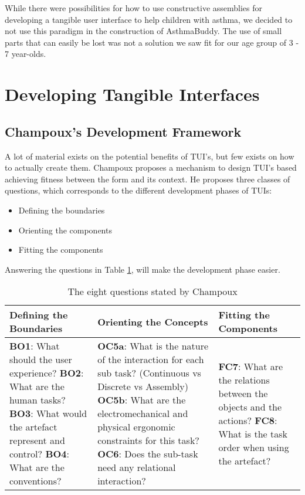 While there were possibilities for how to use constructive assemblies for developing a tangible user interface to help children with asthma, we decided to not use this paradigm in the construction of AsthmaBuddy. The use of small parts that can easily be lost was not a solution we saw fit for our age group of 3 - 7 year-olds.


\section{Developing Tangible Interfaces}

\subsection{Champoux's Development Framework}
\label{sec:champoux}
A lot of material exists on the potential benefits of TUI's, but few exists on how to actually create them. Champoux proposes a mechanism to design TUI's based achieving fitness between the form and its context\cite{champoux2007design}.
He proposes three classes of questions, which corresponds to the different development phases of TUIs:
\begin{itemize}
  \item Defining the boundaries
  \item Orienting the components
  \item Fitting the components
\end{itemize} 


Answering the questions in Table \ref{tab:tuidesign}, will make the development phase easier.   


\begin{table}[h]
	\begin{tabular}{| p{5.0cm} | p{5.0cm} | p{5.0cm} |}
	\hline
	\textbf{Defining the Boundaries} & \textbf{Orienting the Concepts} & \textbf{Fitting the Components} \\
	\hline
	\textbf{BO1}: What should the user experience? \newline
	\textbf{BO2}: What are the human tasks? \newline
	\textbf{BO3}: What would the artefact represent and control? \newline 
	\textbf{BO4}: What are the conventions? \newline 
	&
	\textbf{OC5a}: What is the nature of the interaction for each sub task? (Continuous vs Discrete vs Assembly) \newline
	\textbf{OC5b}: What are the electromechanical and physical ergonomic constraints for this task? \newline
	\textbf{OC6}: Does the sub-task need any relational interaction? \newline
	&
	\textbf{FC7}: What are the relations between the objects and the actions? \newline 
	\textbf{FC8}: What is the task order when using the artefact? \\ 
	\hline
	
	\end{tabular}
	\caption{The eight questions stated by Champoux\cite{champoux2007design}}
	\label{tab:tuidesign}
\end{table}  

